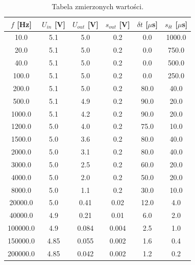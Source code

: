\documentclass[10pt,a4paper]{article}
\begin{document}
\begin{table}[htp!]
\begin{center}
\begin{tabular}{|c|c|c|c|c|c|}
\hline
	$f$ [Hz] & $U_{in}$ [V] & $U_{out}$ [V] & $s_{out}$ [V] & $\delta t$ [$\mu$s] & $ s_{\delta t}$ [$\mu$s] \\ \hline
	10.0 & 5.1 & 5.0 & 0.2 & 0.0 & 1000.0 \\ \hline
	20.0 & 5.1 & 5.0 & 0.2 & 0.0 & 750.0 \\ \hline
	40.0 & 5.1 & 5.0 & 0.2 & 0.0 & 500.0 \\ \hline
	100.0 & 5.1 & 5.0 & 0.2 & 0.0 & 250.0 \\ \hline
	200.0 & 5.1 & 5.0 & 0.2 & 80.0 & 40.0 \\ \hline
	500.0 & 5.1 & 4.9 & 0.2 & 90.0 & 20.0 \\ \hline
	1000.0 & 5.1 & 4.2 & 0.2 & 90.0 & 20.0 \\ \hline
	1200.0 & 5.0 & 4.0 & 0.2 & 75.0 & 10.0 \\ \hline
	1500.0 & 5.0 & 3.6 & 0.2 & 80.0 & 40.0 \\ \hline
	2000.0 & 5.0 & 3.1 & 0.2 & 80.0 & 40.0 \\ \hline
	3000.0 & 5.0 & 2.5 & 0.2 & 60.0 & 20.0 \\ \hline
	4000.0 & 5.0 & 2.0 & 0.2 & 50.0 & 20.0 \\ \hline
	8000.0 & 5.0 & 1.1 & 0.2 & 30.0 & 10.0 \\ \hline
	20000.0 & 5.0 & 0.41 & 0.02 & 12.0 & 4.0 \\ \hline
	40000.0 & 4.9 & 0.21 & 0.01 & 6.0 & 2.0 \\ \hline
	100000.0 & 4.9 & 0.084 & 0.004 & 2.5 & 1.0 \\ \hline
	150000.0 & 4.85 & 0.055 & 0.002 & 1.6 & 0.4 \\ \hline
	200000.0 & 4.85 & 0.042 & 0.002 & 1.2 & 0.2 \\ \hline
\end{tabular} 
\caption{Tabela zmierzonych wartości.} 
\end{center}
\end{table}
\end{document}
